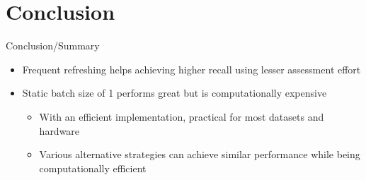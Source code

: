 \documentclass{beamer}
\begin{document}
\section{Conclusion}
\begin{frame}{Conclusion/Summary}
\begin{itemize}
    \item Frequent refreshing helps achieving higher recall using lesser
       assessment effort
    \item Static batch size of 1 performs great but is computationally expensive
        \begin{itemize}
            \item With an efficient implementation, practical for most datasets and hardware
            \item Various alternative strategies can achieve similar performance while
            being computationally efficient
        \end{itemize}
\end{itemize}
\end{frame}
\end{document}
